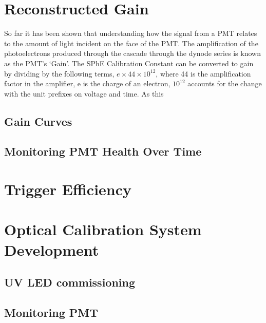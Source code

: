 \section{Reconstructed Gain}
So far it has been shown that understanding how the signal from a PMT relates to the amount of light incident on the face of the PMT. The amplification of the photoelectrons produced through the cascade through the dynode series is known as the PMT's `Gain'. The SPhE Calibration Constant can be converted to gain by dividing by the following terms, $e\times44\times10^{12}$, where 44 is the amplification factor in the amplifier, e is the charge of an electron, $10^{12}$ accounts for the change with the unit prefixes on voltage and time. As this 

\subsection{Gain Curves}
\subsection{Monitoring PMT Health Over Time}

\section{Trigger Efficiency}

\section{Optical Calibration System Development}
\subsection{UV LED commissioning}

\subsection{Monitoring PMT}